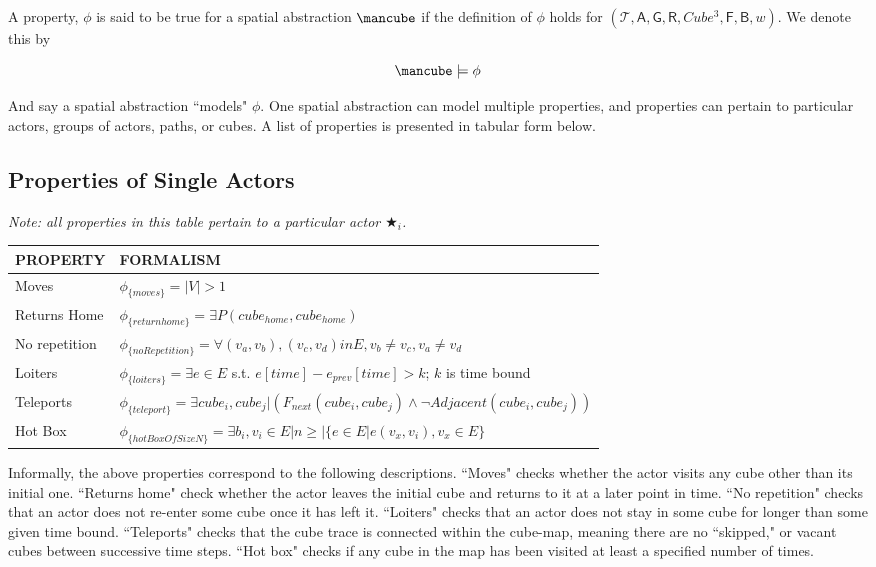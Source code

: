 A property, $\phi$ is said to be true for a spatial abstraction $\cube$ if the definition of $\phi$ holds for $(\mathcal{T}, \mathsf{A}, \mathsf{G}, \mathsf{R}, Cube^3, \mathsf{F}, \mathsf{B}, w)$.
We denote this by 

\begin{equation}
  \cube \models \phi
\end{equation}

And say a spatial abstraction ``models" $\phi$.
One spatial abstraction can model multiple properties, and properties can pertain to particular actors, groups of actors, paths, or cubes.
A list of properties is presented in tabular form below.

\subsection{Properties of Single Actors}

\emph{Note: all properties in this table pertain to a particular actor $\bigstar_i$.}
\begin{tabular}{| p{2.8cm} | p{11.5cm} | }
\hline
PROPERTY & FORMALISM \\ \hline
Moves & $\phi_{\{moves\}} = |V| > 1$ \\ \hline
Returns Home & $\phi_{\{returnhome\}} = \exists P(cube_{home}, cube_{home})$ \\ \hline
No repetition & $\phi_{\{noRepetition\}} = \forall (v_a, v_b), (v_c,v_d) in E, v_b \neq v_c, v_a \neq v_d$ \\ \hline
 Loiters & $\phi_{\{loiters\}} =  \exists e \in E$ s.t. $e[time] - e_{prev}[time] > k$; $k$ is time bound \\ \hline
Teleports & $\phi_{\{teleport\}}=  \exists  cube_i, cube_j | (F_{next}(cube_i, cube_j) \land \lnot Adjacent(cube_i, cube_j))$ \\ \hline
Hot Box & $\phi_{\{hotBoxOfSizeN\}} = \exists b_i, v_i \in E | n \geq |\{e \in E | e(v_x, v_i), v_x \in E\}$ \\ \hline
\end{tabular}

Informally, the above properties correspond to the following descriptions.
``Moves" checks whether the actor visits any cube other than its initial one.
``Returns home" check whether the actor leaves the initial cube and returns to it at a later point in time.
``No repetition" checks that an actor does not re-enter some cube once it has left it.
``Loiters" checks that an actor does not stay in some cube for longer than some given time bound.
``Teleports" checks that the cube trace is connected within the cube-map, meaning there are no ``skipped," or vacant cubes between successive time steps.
``Hot box" checks if any cube in the map has been visited at least a specified number of times.


